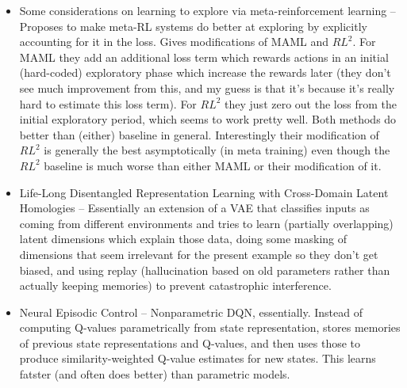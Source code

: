 \documentclass[11pt]{article}
\begin{document}
\begin{itemize}
\item Some considerations on learning to explore via meta-reinforcement learning -- Proposes to make meta-RL systems do better at exploring by explicitly accounting for it in the loss. Gives modifications of MAML and $RL^2$. For MAML they add an additional loss term which rewards actions in an initial (hard-coded) exploratory phase which increase the rewards later (they don't see much improvement from this, and my guess is that it's because it's really hard to estimate this loss term). For $RL^2$ they just zero out the loss from the initial exploratory period, which seems to work pretty well. Both methods do better than (either) baseline in general. Interestingly their modification of $RL^2$ is generally the best asymptotically (in meta training) even though the $RL^2$ baseline is much worse than either MAML or their modification of it.
\item Life-Long Disentangled Representation Learning with Cross-Domain Latent Homologies -- Essentially an extension of a VAE that classifies inputs as coming from different environments and tries to learn (partially overlapping) latent dimensions which explain those data, doing some masking of dimensions that seem irrelevant for the present example so they don't get biased, and using replay (hallucination based on old parameters rather than actually keeping memories) to prevent catastrophic interference. \citep{Achille2018}
\item Neural Episodic Control -- Nonparametric DQN, essentially. Instead of computing Q-values parametrically from state representation, stores memories of previous state representations and Q-values, and then uses those to produce similarity-weighted Q-value estimates for new states. This learns fatster (and often does better) than parametric models. \citep{Pritzel2017}

\end{itemize}
\end{document}
